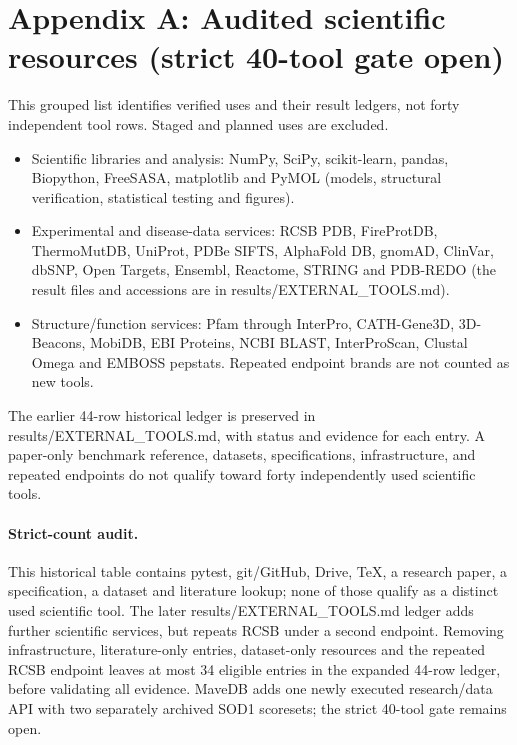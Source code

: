 \section*{Appendix A: Audited scientific resources (strict 40-tool gate open)}
This grouped list identifies verified uses and their result ledgers, not forty independent tool rows. Staged and planned uses are excluded.
\begin{itemize}
\item Scientific libraries and analysis: NumPy, SciPy, scikit-learn, pandas, Biopython, FreeSASA, matplotlib and PyMOL (models, structural verification, statistical testing and figures).
\item Experimental and disease-data services: RCSB PDB, FireProtDB, ThermoMutDB, UniProt, PDBe SIFTS, AlphaFold DB, gnomAD, ClinVar, dbSNP, Open Targets, Ensembl, Reactome, STRING and PDB-REDO (the result files and accessions are in results/EXTERNAL\_TOOLS.md).
\item Structure/function services: Pfam through InterPro, CATH-Gene3D, 3D-Beacons, MobiDB, EBI Proteins, NCBI BLAST, InterProScan, Clustal Omega and EMBOSS pepstats. Repeated endpoint brands are not counted as new tools.
\end{itemize}
The earlier 44-row historical ledger is preserved in results/EXTERNAL\_TOOLS.md, with status and evidence for each entry. A paper-only benchmark reference, datasets, specifications, infrastructure, and repeated endpoints do not qualify toward forty independently used scientific tools.
\paragraph{Strict-count audit.} This historical table contains pytest, git/GitHub, Drive, TeX, a research paper, a specification, a dataset and literature lookup; none of those qualify as a distinct used scientific tool. The later results/EXTERNAL\_TOOLS.md ledger adds further scientific services, but repeats RCSB under a second endpoint. Removing infrastructure, literature-only entries, dataset-only resources and the repeated RCSB endpoint leaves at most 34 eligible entries in the expanded 44-row ledger, before validating all evidence. MaveDB adds one newly executed research/data API with two separately archived SOD1 scoresets; the strict 40-tool gate remains open.\\
